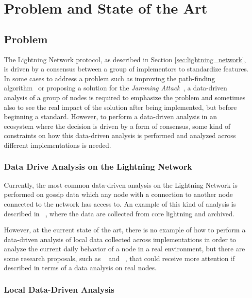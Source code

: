 \chapter{Problem and State of the Art}\label{sec:problem_and_state_of_the_art}

\section{Problem}

The Lightning Network protocol, as described in Section \ref{sec:lightning_network}, is 
driven by a consensus between a group of implementors to standardize
features. In some cases to address a problem such as 
improving the path-finding algorithm~\cite{DBLP:journals/corr/abs-2103-08576} or 
proposing a solution for the \emph{Jamming Attack}~\cite{cryptoeprint:2022/1454}, 
a data-driven analysis of a group of nodes is required to emphasize the
problem and sometimes also to see the real impact of the solution after being 
implemented, but before beginning a standard.
However, to perform a data-driven analysis in an ecosystem where the decision
is driven by a form of consensus, some kind of 
constraints on how this data-driven analysis is performed and analyzed across 
different implementations is needed.

\subsection{Data Drive Analysis on the Lightning Network}

Currently, the most common data-driven analysis on the Lightning Network is performed 
on gossip data which any node  with a connection to another node connected 
to the network has access to. An example of this kind of analysis is described in ~\cite{lngossip},
where the data are collected from core lightning and archived.

However, at the current state of the art, there is no example of how to perform
a data-driven analysis of local data collected across implementations in order to 
analyze the current daily behavior of a node in a real environment, but there are some research proposals,  such as ~\cite{DBLP:journals/corr/abs-2103-08576} and ~\cite{cryptoeprint:2022/1454}, that could receive more attention if described  in terms 
of  a data analysis on real nodes.


\subsection{Local Data-Driven Analysis}

